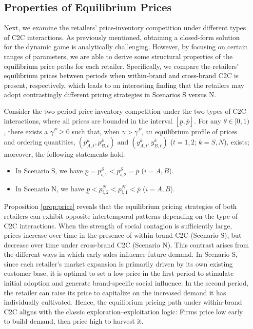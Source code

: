 \documentclass[nonblindrev,copyedit]{informs1}
\begin{document}
\subsection{Properties of Equilibrium Prices} \label{sec:pricing-monontone}

Next, we examine the retailers' price-inventory competition under different types of C2C interactions. As previously mentioned, obtaining a closed-form solution for the dynamic game is analytically challenging. However, by focusing on certain ranges of parameters, we are able to derive some structural properties of the equilibrium price paths for each retailer. Specifically, we compare the retailers' equilibrium prices between periods when within-brand and cross-brand C2C is present, respectively, which leads to an interesting finding that the retailers may adopt contrastingly different pricing strategies in Scenarios S versus N.

\begin{proposition}
\label{prop:price}
Consider the two-period price-inventory competition under the two types of C2C interactions, where all prices are bounded in the interval $[\underline{p},\overline{p}]$. For any $\theta \in [0,1)$, there exists a $\gamma^P \geq 0$ such that, when $\gamma > \gamma^P $, an equilibrium profile of prices and ordering quantities, $(p^k_{A,t}, p^k_{B,t})$ and $(y^k_{A,t}, y^k_{B,t})$ ($t = 1, 2$; $k = S, N$), exists; moreover, the following statements hold:
\begin{itemize}
\item[(a)] In Scenario S, we have $\underline{p} = p^{S}_{i,1} < p^{S}_{i,2} = \overline{p}$ ($i = A, B$).
\item[(b)] In Scenario N, we have $\underline{p} < p^{N}_{i,2} < p^{N}_{i,1} < \overline{p}$ ($i = A, B$).
\end{itemize}
\end{proposition}

Proposition \ref{prop:price} reveals that the equilibrium pricing strategies of both retailers can exhibit opposite intertemporal patterns depending on the type of C2C interactions. When the strength of social contagion is sufficiently large, prices increase over time in the presence of within-brand C2C (Scenario S), but decrease over time under cross-brand C2C (Scenario N). This contrast arises from the different ways in which early sales influence future demand. In Scenario S, since each retailer's market expansion is primarily driven by its own existing customer base, it is optimal to set a low price in the first period to stimulate initial adoption and generate brand-specific social influence. In the second period, the retailer can raise its price to capitalize on the increased demand it has individually cultivated. Hence, the equilibrium pricing path under within-brand C2C aligns with the classic exploration–exploitation logic: Firms price low early to build demand, then price high to harvest it.
\end{document}
